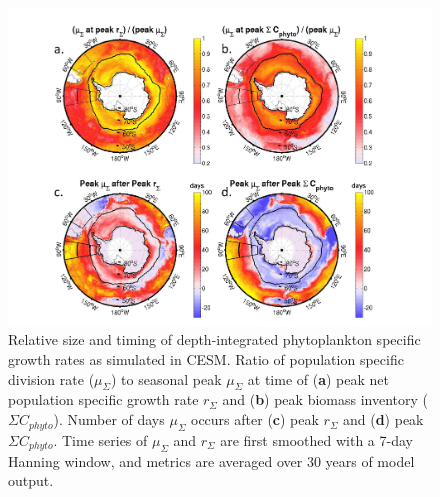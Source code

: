 \begin{figure}[!htbp]
\begin{adjustwidth}{-1in}{-1in}
 \centering
 \includegraphics[scale=.2]{figures/Ch2/Figure_2.jpg}
\end{adjustwidth}
\caption[Relative size and timing of simulated depth-integrated phytoplankton specific growth rates]{Relative size and timing of depth-integrated phytoplankton specific growth rates as simulated in CESM. Ratio of population specific division rate ($\mu_\Sigma$) to seasonal peak $\mu_\Sigma$ at time of (\textbf{a}) peak net population specific growth rate $r_\Sigma$ and (\textbf{b}) peak biomass inventory ($\Sigma C_{phyto}$). Number of days $\mu_\Sigma$ occurs after (\textbf{c}) peak $r_\Sigma$ and (\textbf{d}) peak $\Sigma C_{phyto}$. Time series of $\mu_\Sigma$ and  $r_\Sigma$ are first smoothed with a 7-day Hanning window, and metrics are averaged over 30 years of model output.}
\label{fig:Fig2}
\end{figure}



